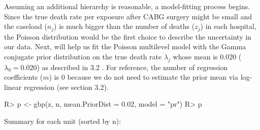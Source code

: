 \documentclass[article]{jss}
\begin{document}
Assuming an additional hierarchy is reasonable, a model-fitting process begins.  Since the true death rate per exposure after CABG surgery might be small and the caseload ($n_{j}$) is much bigger than the number of deaths ($z_{j}$) in each hospital, the Poisson distribution would be the first choice to describe the uncertainty in our data. Next,  will help us fit the Poisson multilevel model with the Gamma conjugate prior distribution on the true death rate $\lambda_{j}$ whose mean is 0.020 ($\lambda_{0}=0.020$) as described in 3.2 . For reference, the number of regression coefficients ($m$) is 0 because we do not need to estimate the prior mean via log-linear regression (see section 3.2).
\begin{CodeChunk}
\begin{CodeInput}
R> p <- gbp(z, n, mean.PriorDist = 0.02, model = "pr")
R> p
\end{CodeInput}
\begin{CodeOutput}
Summary for each unit (sorted by n):


\end{CodeOutput}
\end{CodeChunk}
\end{document}
